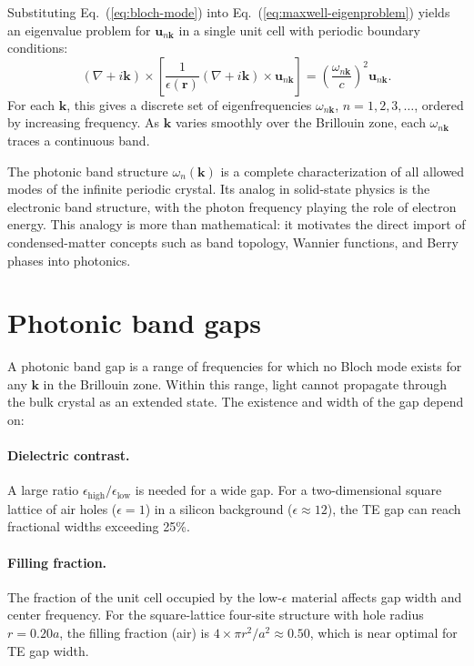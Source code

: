 \documentclass[12pt,a4paper,oneside]{book}
\theoremstyle{plain}
\theoremstyle{definition}
\theoremstyle{remark}
\newcommand{\eqnref}[1]{Eq.~(\ref{#1})}
\newcommand{\vb}[1]{\bm{#1}}
\newcommand{\eps}{\epsilon}
\newcommand{\om}{\omega}
\newcommand{\kvec}{\vb{k}}
\newcommand{\rvec}{\vb{r}}
\begin{document}
Substituting \eqnref{eq:bloch-mode} into \eqnref{eq:maxwell-eigenproblem} yields an eigenvalue problem for $\vb{u}_{n\kvec}$ in a single unit cell with periodic boundary conditions:
\begin{equation}
  (\nabla+i\kvec) \times \left[\frac{1}{\eps(\rvec)}(\nabla+i\kvec)\times\vb{u}_{n\kvec}\right] = \left(\frac{\om_{n\kvec}}{c}\right)^2 \vb{u}_{n\kvec}.
\end{equation}
For each $\kvec$, this gives a discrete set of eigenfrequencies $\om_{n\kvec}$, $n=1,2,3,\ldots$, ordered by increasing frequency. As $\kvec$ varies smoothly over the Brillouin zone, each $\om_{n\kvec}$ traces a continuous band.

The photonic band structure $\om_n(\kvec)$ is a complete characterization of all allowed modes of the infinite periodic crystal. Its analog in solid-state physics is the electronic band structure, with the photon frequency playing the role of electron energy. This analogy is more than mathematical: it motivates the direct import of condensed-matter concepts such as band topology, Wannier functions, and Berry phases into photonics.

\section{Photonic band gaps}
\label{sec:bandgaps}

A photonic band gap is a range of frequencies for which no Bloch mode exists for any $\kvec$ in the Brillouin zone. Within this range, light cannot propagate through the bulk crystal as an extended state. The existence and width of the gap depend on:

\paragraph{Dielectric contrast.} A large ratio $\eps_\mathrm{high}/\eps_\mathrm{low}$ is needed for a wide gap. For a two-dimensional square lattice of air holes ($\eps=1$) in a silicon background ($\eps \approx 12$), the TE gap can reach fractional widths exceeding 25\%.

\paragraph{Filling fraction.} The fraction of the unit cell occupied by the low-$\eps$ material affects gap width and center frequency. For the square-lattice four-site structure with hole radius $r = 0.20a$, the filling fraction (air) is $4 \times \pi r^2/a^2 \approx 0.50$, which is near optimal for TE gap width.
\end{document}

